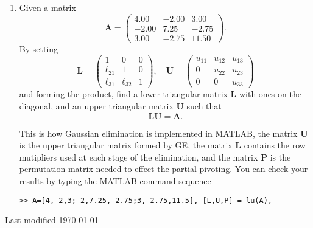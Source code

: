 \documentclass[11pt,a4paper]{article}
\def\bA{\mathbf{A}}
\begin{document}
\begin{enumerate}

\item\label{qdjsx4}
Given a matrix
$$\bA= \left ( \begin{array}{rrr}
         4.00 & -2.00 & 3.00\\
        -2.00 &  7.25 & -2.75 \\
         3.00 & -2.75 & 11.50 \
         \end{array} \right ) . $$
  By setting 
$$  \mathbf{L} =  \left ( \begin{array}{rrr}
         1 & 0 & 0\\
        \ell_{21} &  1 &  0 \\
        \ell_{31} & \ell_{32} & 1
         \end{array} \right ),  \quad
          \mathbf{U} =  \left ( \begin{array}{rrr}
         u_{11} & u_{12} & u_{13} \\
        0  &  u_{22} & u_{23} \\
        0 & 0  & u_{33}    \end{array} \right )
        $$
 and forming the product,
find a lower triangular matrix $ \mathbf{L}$ with ones on the diagonal,
and an upper  triangular matrix $ \mathbf{U}$ such that 
$$  \mathbf{L} \mathbf{U} = \bA.$$

 This is how Gaussian elimination is implemented in MATLAB,
 the matrix $\mathbf{U} $ is the upper triangular matrix formed by GE, the
 matrix $\mathbf{L} $ contains the row mutipliers used at each stage
 of the elimination, and the matrix $\mathbf{P}$  is the permutation 
 matrix   needed  to effect the partial pivoting.
You can check your results by typing the MATLAB command sequence
\begin{verbatim}
>> A=[4,-2,3;-2,7.25,-2.75;3,-2.75,11.5], [L,U,P] = lu(A),
\end{verbatim}



\end{enumerate}
\hfill {\tiny Last modified  \today}
\vfill\eject
\end{document}
